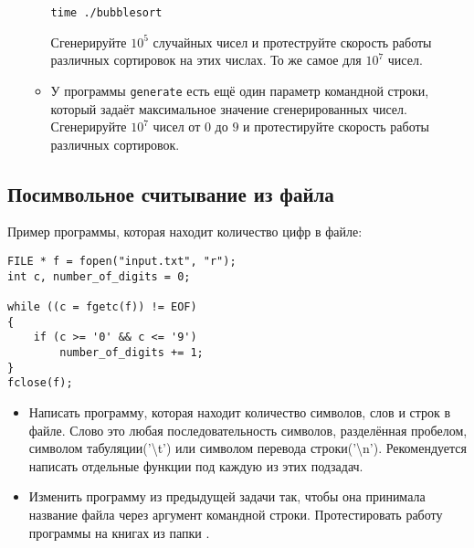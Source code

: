 \documentclass{article}
\begin{document}
\begin{itemize}
\begin{itemize}
\begin{verbatim}
time ./bubblesort
\end{verbatim}
Сгенерируйте $10^5$ случайных чисел и протеструйте скорость работы различных сортировок на этих числах. То же самое для $10^7$ чисел.
\item У программы \texttt{generate} есть ещё один параметр командной строки, который задаёт максимальное значение сгенерированных чисел. Сгенерируйте $10^7$ чисел от $0$ до $9$ и протестируйте скорость работы различных сортировок.
\end{itemize}
\end{itemize}

\subsection*{Посимвольное считывание из файла}

Пример программы, которая находит количество цифр в файле:
\begin{lstlisting}
FILE * f = fopen("input.txt", "r");
int c, number_of_digits = 0;

while ((c = fgetc(f)) != EOF)
{
    if (c >= '0' && c <= '9')
        number_of_digits += 1;
}
fclose(f);
\end{lstlisting}
\begin{itemize}
\item Написать программу, которая находит количество символов, слов и строк в файле. Слово это любая последовательность символов, разделённая пробелом, символом табуляции('\textbackslash t') или символом перевода строки('\textbackslash n'). Рекомендуется написать отдельные функции под каждую из этих подзадач.
\item Изменить программу из предыдущей задачи так, чтобы она принимала название файла через аргумент командной строки. Протестировать работу программы на книгах из папки .
\end{itemize}
\end{document}

